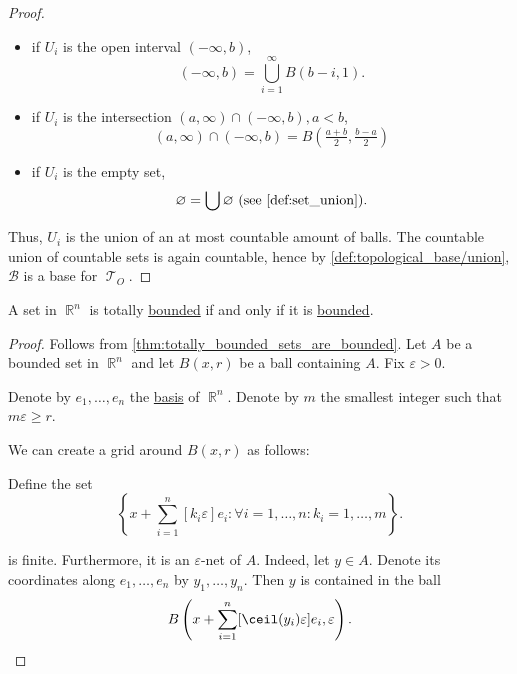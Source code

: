 \begin{proof}
\begin{itemize}
    \item if \( U_i \) is the open interval \( (-\infty, b) \),
          \begin{equation*}
            (-\infty, b) = \bigcup_{i=1}^\infty B(b - i, 1).
          \end{equation*}

    \item if \( U_i \) is the intersection \( (a, \infty) \cap (-\infty, b), a < b \),
          \begin{equation*}
            (a, \infty) \cap (-\infty, b) = B(\tfrac {a + b} 2, \tfrac {b - a} 2)
          \end{equation*}

    \item if \( U_i \) is the empty set,
          \begin{equation*}
            \varnothing = \bigcup \varnothing \text{ (see \cref{def:set_union})}.
          \end{equation*}
  \end{itemize}

  Thus, \( U_i \) is the union of an at most countable amount of balls. The countable union of countable sets is again countable, hence by \cref{def:topological_base/union}, \( \mathcal{B} \) is a base for \( \mscrT_O \).
\end{proof}

\begin{proposition}\label{thm:rn_bounded_iff_totally_bounded}
  A set in \( \BbbR^n \) is totally \hyperref[def:totally_bounded_set]{bounded} if and only if it is \hyperref[def:metric_space/bounded_set]{bounded}.
\end{proposition}
\begin{proof}
  \SufficiencySubProof Follows from \cref{thm:totally_bounded_sets_are_bounded}.
  \NecessitySubProof Let \( A \) be a bounded set in \( \BbbR^n \) and let \( B(x, r) \) be a ball containing \( A \). Fix \( \varepsilon > 0 \).

  Denote by \( e_1, \ldots, e_n \) the \hyperref[def:hamel_basis]{basis} of \( \BbbR^n \). Denote by \( m \) the smallest integer such that \( m \varepsilon \geq r \).

  We can create a grid around \( B(x, r) \) as follows:

  Define the set
  \begin{equation*}
    \left\{ x + \sum_{i=1}^n [k_i \varepsilon] e_i \colon \forall i = 1, \ldots, n: k_i = 1, \ldots, m \right\}.
  \end{equation*}

  is finite. Furthermore, it is an \( \varepsilon \)-net of \( A \). Indeed, let \( y \in A \). Denote its coordinates along \( e_1, \ldots, e_n \) by \( y_1, \ldots, y_n \). Then \( y \) is contained in the ball
  \begin{equation*}
    B\left(x + \sum_{i=1}^n [\ceil(y_i) \varepsilon] e_i, \varepsilon \right).
  \end{equation*}
\end{proof}

